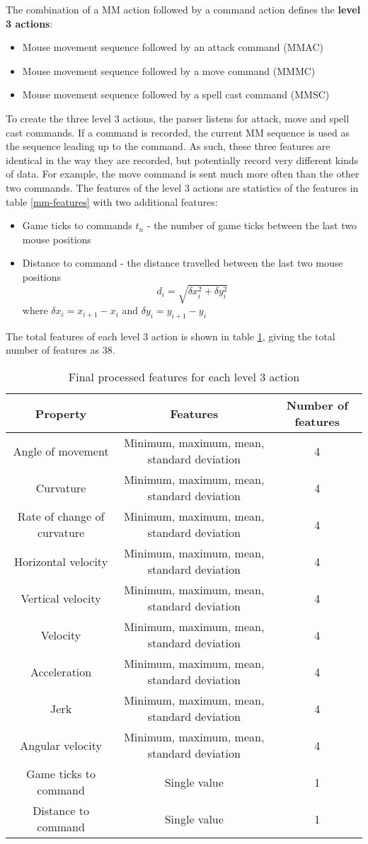 \documentclass{SizheArticle}
\begin{document}
The combination of a MM action followed by a command action defines the \textbf{level 3 actions}:
\begin{itemize}
\item Mouse movement sequence followed by an attack command (MMAC)
\item Mouse movement sequence followed by a move command (MMMC)
\item Mouse movement sequence followed by a spell cast command (MMSC)
\end{itemize}
To create the three level 3 actions, the parser listens for attack, move and spell cast commands. If a command is recorded, the current MM sequence is used as the sequence leading up to the command. As such, these three features are identical in the way they are recorded, but potentially record very different kinds of data. For example, the move command is sent much more often than the other two commands. The features of the level 3 actions are statistics of the features in table \ref{mm-features} with two additional features:
\begin{itemize}
\item Game ticks to commands $t_n$ - the number of game ticks between the last two mouse positions
\item Distance to command - the distance travelled between the last two mouse positions
\begin{equation}
d_i = \sqrt{\delta x_{i}^2 + \delta y_{i}^2}
\end{equation} 
where $\delta x_i = x_{i+1} - x_i$ and $\delta y_i = y_{i+1} - y_i$
\end{itemize}

The total features of each level 3 action is shown in table \ref{tbl-level3features}, giving the total number of features as 38. 
\newcommand{\fourfeatures}[1]{#1 & Minimum, maximum, mean, standard deviation & 4 \\ \hline}
\begin{table}[H]
\renewcommand*{\arraystretch}{1.5}
\centering
\begin{tabular}{| c | c | c |}
\hline
\textbf{Property} & \textbf{Features} & \textbf{Number of features} \\ \hline
\fourfeatures{Angle of movement}
\fourfeatures{Curvature}
\fourfeatures{Rate of change of curvature}
\fourfeatures{Horizontal velocity}
\fourfeatures{Vertical velocity}
\fourfeatures{Velocity}
\fourfeatures{Acceleration}
\fourfeatures{Jerk}
\fourfeatures{Angular velocity}
Game ticks to command & Single value & 1 \\ \hline
Distance to command & Single value & 1 \\ \hline
\end{tabular}
\caption{Final processed features for each level 3 action}
\label{tbl-level3features}
\end{table}
\end{document}
